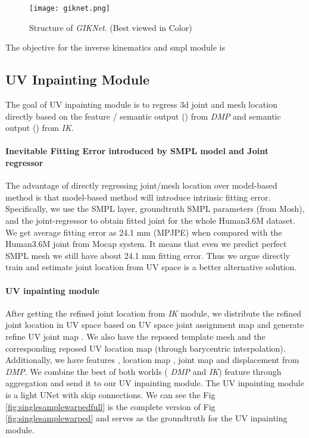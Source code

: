 \documentclass[10pt,twocolumn,letterpaper]{article}
\begin{document}
\begin{figure}
\centering
\texttt{[image: giknet.png]}
\caption{{Structure of \textit{GIKNet}. (Best viewed in Color) }}
\label{fig:giknet}
\end{figure}

The objective for the inverse kinematics and smpl module is 



\subsection{UV Inpainting Module}

The goal of UV inpainting module is to regress 3d joint and mesh location directly based on the feature / semantic output () from \textit{DMP} and semantic output () from \textit{IK}.

\paragraph{Inevitable Fitting Error introduced by SMPL model and Joint regressor} The advantage of directly regressing joint/mesh location over model-based method is that model-based method will introduce intrinsic fitting error. Specifically, we use the SMPL layer, groundtruth SMPL parameters (from Mosh),  and the joint-regressor \cite{spin} to obtain  fitted joint for the whole Human3.6M dataset. We get average fitting error as 24.1 mm (MPJPE) when compared with the Human3.6M joint from Mocap system. It means that even we predict perfect SMPL mesh we still have about 24.1 mm fitting error. Thus we argue directly train and estimate joint location from UV space is a better alternative solution. 

\paragraph{UV inpainting module} After getting the refined joint location  from \textit{IK} module, we   distribute the refined joint location in UV space based on UV space joint assignment map  and generate refine UV joint map . We also have the reposed template mesh and the corresponding reposed UV location map  (through barycentric interpolation). 
Additionally, we have features , location map , joint map  and displacement  from \textit{DMP}. We combine the best of both worlds ( \textit{DMP} and  \textit{IK}) feature through aggregation and send it to our UV inpainting module. The UV inpainting module is a light UNet with skip connections. We can see the Fig \ref{fig:singlesamplewarpedfull} is the complete version of Fig \ref{fig:singlesamplewarped} and  serves as the groundtruth for the UV inpainting module.
\end{document}
